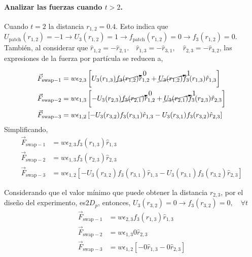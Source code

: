 \documentclass[../main.tex]{subfiles}
\begin{document}
\paragraph{Analizar las fuerzas cuando $t>2$.}
Cuando \(t=2\) la distancia \(r_{1,2}=0.4\).
Esto indica que \(U_{\mathrm{patch}}(r_{1,2}) = -1\rightarrow U_3(r_{1,2}) =1\rightarrow f_{\mathrm{patch}}(r_{1,2})=0\rightarrow f_{3}(r_{1,2})=0\).
También, al considerar que \(\hat{r}_{1,2}=-\hat{r}_{2,1}.\quad\hat{r}_{1,3}=-\hat{r}_{3,1},\quad\hat{r}_{2,3}=-\hat{r}_{3,2}\), las expresiones de la fuerza por partícula se reducen a,

\begin{align*}
    \vec{F}_{\mathrm{swap}-1} &= w\epsilon_{2,3}\left[
        U_3(r_{1,3})\cancelto{0}{f_3(r_{1,2})}\hat{r}_{1,2} + \cancelto{1}{U_3(r_{1,2})}f_3(r_{1,3})\hat{r}_{1,3}
    \right] \\
    \vec{F}_{\mathrm{swap}-2} &= w\epsilon_{1,3}\left[
        -U_3(r_{2,3})\cancelto{0}{f_3(r_{2,1})}\hat{r}_{1,2} + \cancelto{1}{U_3(r_{2,1})}f_3(r_{2,3})\hat{r}_{2,3}
    \right] \\
    \vec{F}_{\mathrm{swap}-3} &= w\epsilon_{1,2}\left[
            -U_3(r_{3,2})f_3(r_{3,1})\hat{r}_{1,3} - U_3(r_{3,1})f_3(r_{3,2})\hat{r}_{2,3}
    \right]
\end{align*}
Simplificando,
\begin{align*}
    \vec{F}_{\mathrm{swap}-1} &= w\epsilon_{2,3}
        f_3(r_{1,3})\hat{r}_{1,3}
     \\
    \vec{F}_{\mathrm{swap}-2} &= w\epsilon_{1,3}
        f_3(r_{2,3})\hat{r}_{2,3}
     \\
    \vec{F}_{\mathrm{swap}-3} &= w\epsilon_{1,2}\left[
            -U_3(r_{3,2})f_3(r_{3,1})\hat{r}_{1,3} - U_3(r_{3,1})f_3(r_{3,2})\hat{r}_{2,3}
    \right]
\end{align*}

Considerando que el valor mínimo que puede obtener la distancia \(r_{2,3}\), por el diseño del experimento, es\(2D_p\), entonces, \(U_3(r_{3,2}) = 0\rightarrow f_3(r_{3,2})=0,\quad\forall t\)
\begin{align*}
    \vec{F}_{\mathrm{swap}-1} &= w\epsilon_{2,3}
        f_3(r_{1,3})\hat{r}_{1,3}
     \\
    \vec{F}_{\mathrm{swap}-2} &= w\epsilon_{1,3}
        0\hat{r}_{2,3}
     \\
    \vec{F}_{\mathrm{swap}-3} &= w\epsilon_{1,2}\left[
             -0\hat{r}_{1,3}-0\hat{r}_{2,3}
    \right]
\end{align*}
\end{document}
